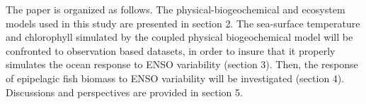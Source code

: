 
The paper is organized as follows. The physical-biogeochemical and ecosystem models used in this study are presented in section 2. The sea-surface temperature and chlorophyll simulated by the coupled physical biogeochemical model will be confronted to observation based datasets, in order to insure that it properly simulates the ocean response to ENSO variability (section 3). Then, the response of epipelagic fish biomass to ENSO variability will be investigated (section 4). Discussions and perspectives are provided in section 5.